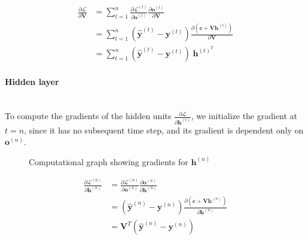\documentclass{article}
\numberwithin{equation}{section}
\begin{document}
\begin{equation}
\label{eqn:backward-V}
\begin{split}
	\frac{\partial \mathcal{L}}{\partial \bm{V}}
		&= \sum_{t=1}^n \frac{\partial \mathcal{L}^{(t)}}{\partial \bm{o}^{(t)}} \frac{\partial \bm{o}^{(t)}}{\partial \bm{V}} \\
		&= \sum_{t=1}^n (\hat{\bm{y}}^{(t)} - \bm{y}^{(t)}) \frac{\partial(\bm{c} + \bm{V}\bm{h}^{(t)})}{\partial \bm{V}} \\
		&= \sum_{t=1}^n (\hat{\bm{y}}^{(t)} - \bm{y}^{(t)}) \; \bm{h}^{(t)^T}
\end{split}
\end{equation}

\paragraph{Hidden layer}\mbox{}\\
To compute the gradients of the hidden units $\frac{\partial \mathcal{L}}{\partial \bm{h}^{(t)}}$, we initialize the gradient at $t = n$, since it has no subsequent time step, and its gradient is dependent only on $\bm{o}^{(n)}$.

\begin{figure}[h!]
\centering
{}
\caption{Computational graph showing gradients for $\bm{h}^{(n)}$}
\label{fig:grad-hn}
\end{figure}

\begin{equation}
\label{eqn:backward-hn}
\begin{split}
	\frac{\partial \mathcal{L}^{(n)}}{\partial \bm{h}^{(n)}}
		&= \frac{\partial \mathcal{L}^{(n)}}{\partial \bm{o}^{(n)}} \frac{\partial \bm{o}^{(n)}}{\partial \bm{h}^{(n)}} \\
		&= (\hat{\bm{y}}^{(n)} - \bm{y}^{(n)}) \frac{\partial(\bm{c} + \bm{V}\bm{h}^{(n)})}{\partial \bm{h}^{(n)}} \\
		&= \bm{V}^T(\hat{\bm{y}}^{(n)} - \bm{y}^{(n)})
\end{split}
\end{equation}
\end{document}
